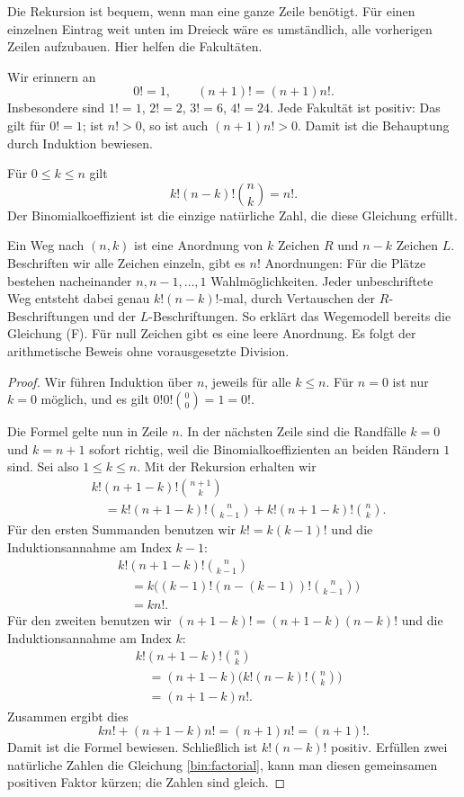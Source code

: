Die Rekursion ist bequem, wenn man eine ganze Zeile benötigt.
Für einen einzelnen Eintrag weit unten im Dreieck wäre es umständlich,
alle vorherigen Zeilen aufzubauen. Hier helfen die Fakultäten.

Wir erinnern an
\[
 0!=1,\qquad (n+1)!=(n+1)n!.
\]
Insbesondere sind $1!=1$, $2!=2$, $3!=6$, $4!=24$.
Jede Fakultät ist positiv: Das gilt für $0!=1$; ist $n!>0$,
so ist auch $(n+1)n!>0$. Damit ist die Behauptung durch Induktion bewiesen.

\begin{satz}[Fakultätenformel]
Für $0\le k\le n$ gilt
\begin{equation}\tag{F}\label{bin:factorial}
 \boxed{\displaystyle k!(n-k)!\binom nk=n!.}
\end{equation}
Der Binomialkoeffizient ist die einzige natürliche Zahl, die diese
Gleichung erfüllt.
\end{satz}

\Beweisidee Ein Weg nach $(n,k)$ ist eine Anordnung von $k$ Zeichen $R$
und $n-k$ Zeichen $L$. Beschriften wir alle Zeichen einzeln, gibt es
$n!$ Anordnungen: Für die Plätze bestehen nacheinander $n,n-1,\ldots,1$
Wahlmöglichkeiten. Jeder unbeschriftete Weg entsteht dabei genau
$k!(n-k)!$-mal, durch Vertauschen der $R$-Beschriftungen und der
$L$-Beschriftungen. So erklärt das Wegemodell bereits die Gleichung (F).
Für null Zeichen gibt es eine leere Anordnung. Es folgt der arithmetische
Beweis ohne vorausgesetzte Division.

\begin{proof}
Wir führen Induktion über $n$, jeweils für alle $k\le n$.
Für $n=0$ ist nur $k=0$ möglich, und es gilt $0!0!\binom00=1=0!$.

Die Formel gelte nun in Zeile $n$. In der nächsten Zeile sind die
Randfälle $k=0$ und $k=n+1$ sofort richtig, weil die Binomialkoeffizienten
an beiden Rändern $1$ sind. Sei also $1\le k\le n$.
Mit der Rekursion erhalten wir
\[
 \begin{aligned}
 &k!(n+1-k)!\binom{n+1}k\\
 &\quad=k!(n+1-k)!\binom n{k-1}
       +k!(n+1-k)!\binom nk.
 \end{aligned}
\]
Für den ersten Summanden benutzen wir $k!=k(k-1)!$ und die
Induktionsannahme am Index $k-1$:
\[
 \begin{aligned}
 &k!(n+1-k)!\binom n{k-1}\\
 &\quad=k\bigl((k-1)!(n-(k-1))!\binom n{k-1}\bigr)\\
 &\quad=kn!.
 \end{aligned}
\]
Für den zweiten benutzen wir $(n+1-k)!=(n+1-k)(n-k)!$ und die
Induktionsannahme am Index $k$:
\[
 \begin{aligned}
 &k!(n+1-k)!\binom nk\\
 &\quad=(n+1-k)\bigl(k!(n-k)!\binom nk\bigr)\\
 &\quad=(n+1-k)n!.
 \end{aligned}
\]
Zusammen ergibt dies
\[
 kn!+(n+1-k)n!=(n+1)n!=(n+1)!.
\]
Damit ist die Formel bewiesen. Schließlich ist $k!(n-k)!$ positiv.
Erfüllen zwei natürliche Zahlen die Gleichung \eqref{bin:factorial},
kann man diesen gemeinsamen positiven Faktor kürzen; die Zahlen sind gleich.
\end{proof}

